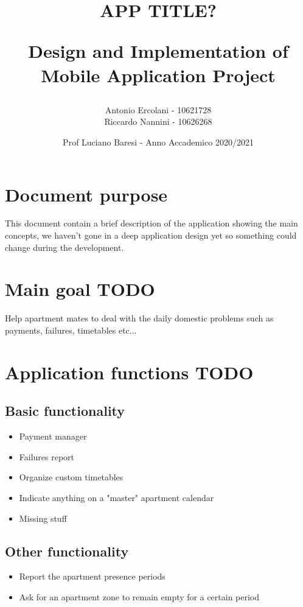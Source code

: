 \documentclass[]{article}
\title{ APP TITLE? \\
	\begin{large} 
		Design and Implementation of Mobile Application Project
	\end{large}}
\author{Antonio Ercolani - 10621728\\Riccardo Nannini - 10626268}
\date{Prof Luciano Baresi - Anno Accademico 2020/2021}
\begin{document}
	
	\maketitle
	
	\begin{paragraph}
		\newline
	\end{paragraph}
	
	\tableofcontents
	
	\newpage
	
	\section{Document purpose}
	This document contain a brief description of the application showing the main concepts, we haven't gone in a deep application design yet so something could change during the development.
	
	\section{Main goal TODO}
	
	Help apartment mates to deal with the daily domestic problems such as payments, failures, timetables etc...
	
	\section{Application functions TODO}
	
		\subsection{Basic functionality}
		\begin{itemize}
			\item Payment manager
			\item Failures report 
			\item Organize custom timetables
			\item Indicate anything on a "master" apartment calendar 
			\item Missing stuff
		\end{itemize}

		\subsection{Other functionality}
		
		\begin{itemize}
			\item Report the apartment presence periods 
			\item Ask for an apartment zone to remain empty for a certain period 
		\end{itemize}
\end{document}
